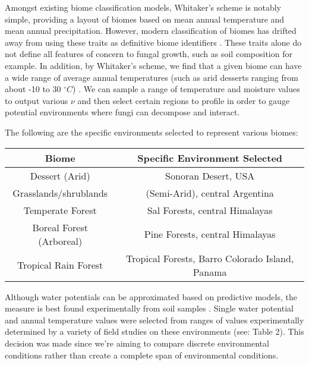 \documentclass[12pt]{article}
\begin{document}
\begin{multicols}{2}
Amongst existing biome classification models, Whitaker's scheme \cite{Whittaker1970} is notably simple, providing a layout of biomes based on mean annual temperature and mean annual precipitation. However, modern classification of biomes has drifted away from using these traits as definitive biome identifiers \cite{Mucina2018}. These traits alone do not define all features of concern to fungal growth, such as soil composition for example. In addition, by Whitaker's scheme, we find that a given biome can have a wide range of average annual temperatures (such as arid desserts ranging from about -10 to 30 $^{\circ}C$) \cite{Whittaker1970}. We can sample a range of temperature and moisture values to output various $\nu$ and then select certain regions to profile in order to gauge potential environments where fungi can decompose and interact.

The following are the specific environments selected to represent various biomes:

\end{multicols}

\begin{savenotes}
	\begin{table}[H]
		\begin{center}
			\begin{tabular}{|c c|} 
				\hline
				Biome & Specific Environment Selected \\ [0.5ex] 
				\hline\hline
				Dessert (Arid) & Sonoran Desert, USA \\ 
				\hline
				Grasslands/shrublands & (Semi-Arid), central Argentina\\
				\hline
				Temperate Forest & Sal Forests, central Himalayas\\
				\hline
				Boreal Forest (Arboreal) & Pine Forests, central Himalayas\\
				\hline
				Tropical Rain Forest & Tropical Forests, Barro Colorado Island, Panama \\
				\hline
			\end{tabular}
			\vspace*{-3ex}
			\label{table1}
		\end{center}
	\end{table}
\end{savenotes}

Although water potentials can be approximated based on predictive models, the measure is best found experimentally from soil samples \cite{Abkenar2019}. Single water potential and annual temperature values were selected from ranges of values experimentally determined by a variety of field studies on these environments (see: Table 2). This decision was made since we're aiming to compare discrete environmental conditions rather than create a complete span of environmental conditions.
\end{document}
